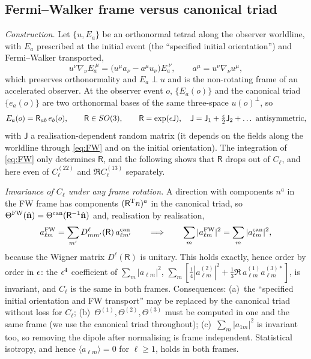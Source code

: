 \subsection{Fermi--Walker frame versus canonical triad}
\label{sec:FW}
\emph{Construction.}  Let $\{u,E_a\}$ be an orthonormal tetrad along the observer worldline, with $E_a$ prescribed at the initial event
(the ``specified initial orientation'') and Fermi--Walker transported,
\begin{equation}
u^\nu\nabla_\nu E_a^{\;\mu}=\big(u^\mu a_\nu-a^\mu u_\nu\big)E_a^{\;\nu},\qquad a^\mu=u^\nu\nabla_\nu u^\mu ,
\label{eq:FW}
\end{equation}
which preserves orthonormality and $E_a\perp u$ and is the non-rotating frame of an accelerated observer.  At the observer
event $o$, $\{E_a(o)\}$ and the canonical triad $\{e_a(o)\}$ are two orthonormal bases of the same three-space $u(o)^\perp$, so
\begin{equation}
E_a(o)=\mathsf R_{ab}\,e_b(o),\qquad \mathsf R\in SO(3),\qquad \mathsf R=\exp(\eps\mathsf J),\quad
\mathsf J=\mathsf J_1+\tfrac{\eps}2\mathsf J_2+\ldots\ \text{antisymmetric},
\end{equation}
with $\mathsf J$ a realisation-dependent random matrix (it depends on the fields along the worldline through \eqref{eq:FW} and on the
initial orientation).  The integration of \eqref{eq:FW} only determines $\mathsf R$, and the following shows that $\mathsf R$ drops out of
$C_\ell$, and here even of $C^{(22)}_\ell$ and $\Re C^{(13)}_\ell$ separately.

\emph{Invariance of $C_\ell$ under any frame rotation.}  A direction with components $n^a$ in the FW frame has components $(\mathsf R^{\rm T}n)^a$
in the canonical triad, so $\Theta^{\rm FW}(\hat{\mathbf n})=\Theta^{\rm can}(\mathsf R^{-1}\hat{\mathbf n})$ and, realisation by realisation,
\begin{equation}
a^{\rm FW}_{\ell m}=\sum_{m'}D^\ell_{mm'}(\mathsf R)\,a^{\rm can}_{\ell m'}\qquad\Longrightarrow\qquad
\sum_m|a^{\rm FW}_{\ell m}|^2=\sum_m|a^{\rm can}_{\ell m}|^2 ,
\label{eq:rotinv}
\end{equation}
because the Wigner matrix $D^\ell(\mathsf R)$ is unitary.  This holds exactly, hence order by order in $\epsilon$: the $\epsilon^4$ coefficient of
$\sum_m|a_{\ell m}|^2$, $\sum_m[\tfrac14|a^{(2)}_{\ell m}|^2+\tfrac13\Re\,a^{(1)}_{\ell m}a^{(3)*}_{\ell m}]$, is invariant, and $C_\ell$ is the same in both frames.
Consequences: (a)~the ``specified initial orientation and FW transport'' may be replaced by the canonical triad without loss for $C_\ell$;
(b)~$\Theta^{(1)},\Theta^{(2)},\Theta^{(3)}$ must be computed in one and the same frame (we use the canonical triad throughout); (c)~$\sum_m|a_{1m}|^2$
is invariant too, so removing the dipole after normalising is frame independent.  Statistical isotropy, and hence $\langle a_{\ell m}\rangle=0$ for
$\ell\ge1$, holds in both frames.

